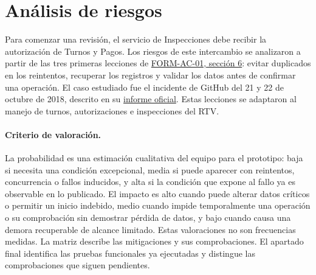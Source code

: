 \documentclass[11pt,a4paper]{article}
\begin{document}
	\section{Análisis de riesgos}
	Para comenzar una revisión, el servicio de Inspecciones debe recibir la autorización de Turnos y Pagos. Los riesgos de este intercambio se analizaron a partir de las tres primeras lecciones de \href{https://github.com/aldhair00/FORM-AC-01-EHPT/blob/8efd7db1b850fbd306bf2dd5afdc1ef69431a1c2/Documento/main.pdf}{FORM-AC-01, sección 6}: evitar duplicados en los reintentos, recuperar los registros y validar los datos antes de confirmar una operación. El caso estudiado fue el incidente de GitHub del 21 y 22 de octubre de 2018, descrito en su \href{https://github.blog/news-insights/company-news/oct21-post-incident-analysis/}{informe oficial}. Estas lecciones se adaptaron al manejo de turnos, autorizaciones e inspecciones del RTV.
	
	\paragraph{Criterio de valoración.}
	La probabilidad es una estimación cualitativa del equipo para el prototipo: baja si necesita una condición excepcional, media si puede aparecer con reintentos, concurrencia o fallos inducidos, y alta si la condición que expone al fallo ya es observable en lo publicado. El impacto es alto cuando puede alterar datos críticos o permitir un inicio indebido, medio cuando impide temporalmente una operación o su comprobación sin demostrar pérdida de datos, y bajo cuando causa una demora recuperable de alcance limitado. Estas valoraciones no son frecuencias medidas. La matriz describe las mitigaciones y sus comprobaciones. El apartado final identifica las pruebas funcionales ya ejecutadas y distingue las comprobaciones que siguen pendientes.
	
\end{document}

